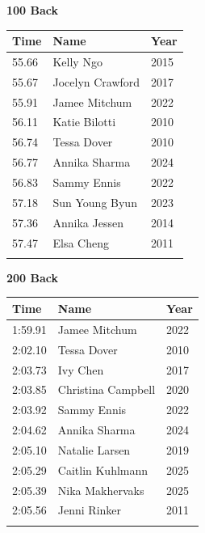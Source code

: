 \vspace{1.2em}
\noindent\begin{minipage}[t]{0.48\textwidth}
\centering
\textbf{\textcolor{teamprimary}{100 Back}}\par
\vspace{0.5em}
\centering
\small
\renewcommand{\arraystretch}{1.0}
\setlength{\tabcolsep}{4pt}
\begin{tabular}{@{}p{1.8cm}p{3.0cm}p{1.0cm}@{}}
\toprule
\textbf{Time} & \textbf{Name} & \textbf{Year} \\
\midrule
55.66 & Kelly Ngo & 2015 \\
55.67 & Jocelyn Crawford & 2017 \\
55.91 & Jamee Mitchum & 2022 \\
56.11 & Katie Bilotti & 2010 \\
56.74 & Tessa Dover & 2010 \\
56.77 & Annika Sharma & 2024 \\
56.83 & Sammy Ennis & 2022 \\
57.18 & Sun Young Byun & 2023 \\
57.36 & Annika Jessen & 2014 \\
57.47 & Elsa Cheng & 2011 \\
\bottomrule
\vspace{0.5em}
\end{tabular}
\end{minipage}
\hfill
\begin{minipage}[t]{0.48\textwidth}
\centering
\textbf{\textcolor{teamprimary}{200 Back}}\par
\vspace{0.5em}
\centering
\small
\renewcommand{\arraystretch}{1.0}
\setlength{\tabcolsep}{4pt}
\begin{tabular}{@{}p{1.8cm}p{3.0cm}p{1.0cm}@{}}
\toprule
\textbf{Time} & \textbf{Name} & \textbf{Year} \\
\midrule
1:59.91 & Jamee Mitchum & 2022 \\
2:02.10 & Tessa Dover & 2010 \\
2:03.73 & Ivy Chen & 2017 \\
2:03.85 & Christina Campbell & 2020 \\
2:03.92 & Sammy Ennis & 2022 \\
2:04.62 & Annika Sharma & 2024 \\
2:05.10 & Natalie Larsen & 2019 \\
2:05.29 & Caitlin Kuhlmann & 2025 \\
2:05.39 & Nika Makhervaks & 2025 \\
2:05.56 & Jenni Rinker & 2011 \\
\bottomrule
\vspace{0.5em}
\end{tabular}
\end{minipage}
